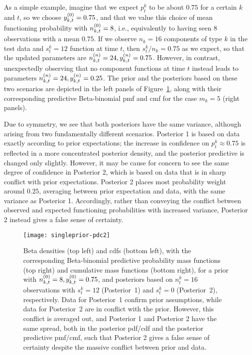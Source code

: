 \documentclass[12pt, a4paper]{elsarticle}
\newcommand{\ptk}{p^k_t}
\begin{document}
As a simple example, imagine that we expect $\ptk$ to be about $0.75$ for a certain $k$ and $t$,
so we choose $y^{(0)}_{k,t} = 0.75$,
and that we value this choice of mean functioning probability with $n^{(0)}_{k,t} = 8$,
i.e., equivalently to having seen $8$ observations with a mean $0.75$.
If we observe $n_k = 16$ components of type $k$ in the test data and $s^k_t = 12$ function at time $t$,
then $s^k_t/n_k = 0.75$ as we expect,
so that the updated parameters are $n^{(n)}_{k,t} = 24, y^{(n)}_{k,t}=0.75$.
However, in contrast, unexpectedly observing that no component functions at time $t$ instead
leads to parameters $n^{(n)}_{k,t} = 24, y^{(n)}_{k,t}=0.25$.
The prior and the posteriors based on these two scenarios
are depicted in the left panels of Figure~\ref{fig:singleprior-pdc},
along with their corresponding predictive Beta-binomial pmf and cmf
for the case $m_k = 5$ (right panels).

Due to symmetry, we see that both posteriors have the same variance,
although arising from two fundamentally different scenarios.
Posterior 1 is based on data exactly according to prior expectations;
the increase in confidence on $\ptk \approx 0.75$
is reflected in a more concentrated posterior density,
and the posterior predictive is changed only slightly.
However, it may be cause for concern to see the same degree of confidence in Posterior 2,
which is based on data that is in sharp conflict with prior expectations.
Posterior 2 places most probability weight around $0.25$,
averaging between prior expectation and data,
with the same variance as Posterior 1.
Accordingly, rather than conveying the conflict between observed
and expected functioning probabilities with increased variance,
Posterior 2 instead gives a false sense of certainty.

\begin{figure}
\texttt{[image: singleprior-pdc2]}
\caption{Beta densities (top left) and cdfs (bottom left),
with the corresponding Beta-binomial predictive probability mass functions (top right) and cumulative mass functions (bottom right),
for a prior with $n^{(0)}_{k,t} = 8, y^{(0)}_{k,t} = 0.75$,
and posteriors based on $n^k_t=16$ observations with $s^k_t=12$ (Posterior~1) and $s^k_t=0$ (Posterior~2), respectively.
Data for Posterior~1 confirm prior assumptions,
while data for Posterior~2 are in conflict with the prior.
However, this conflict is averaged out,
and Posterior 1 and Posterior 2 have the same spread, both in the posterior pdf/cdf and the posterior predictive pmf/cmf,
such that Posterior 2 gives a false sense of certainty despite the massive conflict between prior and data.}
\label{fig:singleprior-pdc}
\end{figure}
\end{document}
